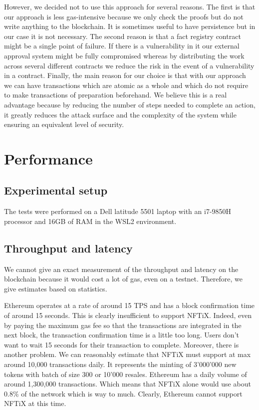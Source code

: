 \documentclass[a4paper,11pt,oneside]{report}
\begin{document}
However, we decided not to use this approach for several reasons. The first is that our approach is less gas-intensive because we only check the proofs but do not write anything to the blockchain. It is sometimes useful to have persistence but in our case it is not necessary. The second reason is that a fact registry contract might be a single point of failure. If there is a vulnerability in it our external approval system might be fully compromised whereas by distributing the work across several different contracts we reduce the risk in the event of a vulnerability in a contract. Finally, the main reason for our choice is that with our approach we can have transactions which are atomic as a whole and which do not require to make transactions of preparation beforehand. We believe this is a real advantage because by reducing the number of steps needed to complete an action, it greatly reduces the attack surface and the complexity of the system while ensuring an equivalent level of security.

\section{Performance}

\subsection{Experimental setup}
The tests were performed on a Dell latitude 5501 laptop with an i7-9850H processor and 16GB of RAM in the WSL2 environment.

\subsection{Throughput and latency}
We cannot give an exact measurement of the throughput and latency on the blockchain because it would cost a lot of gas, even on a testnet. Therefore, we give estimates based on statistics.

Ethereum operates at a rate of around 15 TPS and has a block confirmation time of around 15 seconds. This is clearly insufficient to support NFTiX. Indeed, even by paying the maximum gas fee so that the transactions are integrated in the next block, the transaction confirmation time is a little too long. Users don't want to wait 15 seconds for their transaction to complete. Moreover, there is another problem. We can reasonably estimate that NFTiX must support at max around 10,000 transactions daily. It represents the minting of 3'000'000 new tokens with batch of size 300 or 10'000 resales. Ethereum has a daily volume of around 1,300,000 transactions. Which means that NFTiX alone would use about 0.8\% of the network which is way to much. Clearly, Ethereum cannot support NFTiX at this time.
\end{document}
